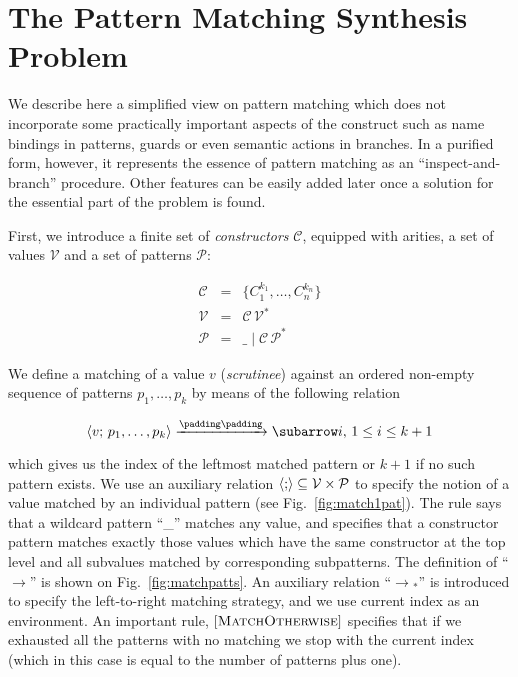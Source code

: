 \section{The Pattern Matching Synthesis Problem}

We describe here a simplified view on pattern matching which does not incorporate some practically important aspects of the construct such as
name bindings in patterns, guards or even semantic actions in branches. In a purified form, however, it  represents the essence of pattern
matching as an ``inspect-and-branch'' procedure. Other features can be easily added later once a solution for the essential part of the problem
is found.

First, we introduce a finite set of \emph{constructors} $\mathcal C$, equipped with arities, a set of values $\mathcal{V}$
and a set of patterns $\mathcal{P}$:
 
\[
 \begin{array}{rcll}
    \mathcal{C} & = & \{ C_1^{k_1}, \dots, C_n^{k_n} \}\\
    \mathcal{V} & = & \mathcal{C}\,\mathcal{V}^*\\  
    \mathcal{P} & = & \_ \mid \mathcal{C}\,\mathcal{P}^*
 \end{array}
\]

We define a matching of a value $v$ (\emph{scrutinee}) against an ordered non-empty sequence of patterns $p_1,\dots,p_k$ by means of the following
relation

\[
\setarrow{\xrightarrow}
\trans{\inbr{v;\,p_1,\dots,p_k}}{}{i},\,1\le i\le k+1
\]

which gives us the index of the leftmost matched pattern or $k+1$ if no such pattern exists. We use an auxiliary relation $\left<{;}\right>\subseteq\mathcal{V}\times\mathcal{P}$
to specify the notion of a value matched by an individual pattern (see Fig.~\ref{fig:match1pat}). The rule  says that
a wildcard pattern ``\_'' matches any value, and  specifies that a constructor pattern matches exactly those values which
have the same constructor at the top level and all subvalues matched by corresponding subpatterns. The definition of ``$\xrightarrow{}{\!\!}$'' is
shown on Fig.~\ref{fig:matchpatts}. An auxiliary relation
 ``$\xrightarrow{}{}_{\!\!*}$'' 
is introduced to specify the left-to-right matching strategy, and we
use current index as an environment. An important rule, $\mbox{[\textsc{MatchOtherwise}]}$ specifies that if we exhausted all the patterns with no matching we stop with
the current index (which in this case is equal to the number of patterns plus one).

